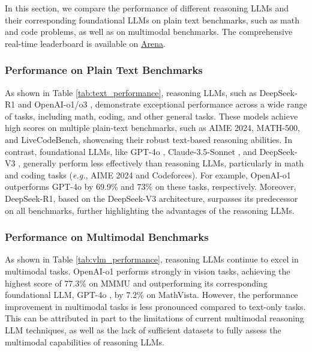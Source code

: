 In this section, we compare the performance of different reasoning LLMs and their corresponding foundational LLMs on plain text benchmarks, such as math and code problems, as well as on multimodal benchmarks. 
The comprehensive real-time leaderboard is available on \href{https://lmarena.ai/?leaderboard}{Arena}.




\subsubsection{Performance on Plain Text Benchmarks}

As shown in Table \ref{tab:text_performance}, reasoning LLMs, such as DeepSeek-R1 \cite{Deepseek-R1} and OpenAI-o1/o3 \cite{openai_o1, o3-mini}, demonstrate exceptional performance across a wide range of tasks, including math, coding, and other general tasks. 
These models achieve high scores on multiple plain-text benchmarks, such as AIME 2024, MATH-500, and LiveCodeBench, showcasing their robust text-based reasoning abilities. 
In contrast, foundational LLMs, like GPT-4o \cite{openai2023gpt4}, Claude-3.5-Sonnet \cite{claude-3-5-sonnet}, and DeepSeek-V3 \cite{liu2024deepseek}, generally perform less effectively than reasoning LLMs, particularly in math and coding tasks (\emph{e.g.}, AIME 2024 and Codeforces). For example, OpenAI-o1 outperforms GPT-4o by 69.9\% and 73\% on these tasks, respectively. 
Moreover, DeepSeek-R1, based on the DeepSeek-V3 architecture, surpasses its predecessor on all benchmarks, further highlighting the advantages of the reasoning LLMs.







\subsubsection{Performance on Multimodal Benchmarks}

As shown in Table \ref{tab:vlm_performance}, reasoning LLMs continue to excel in multimodal tasks. OpenAI-o1 \cite{openai_o1} performs strongly in vision tasks, achieving the highest score of 77.3\% on MMMU and outperforming its corresponding foundational LLM, GPT-4o \cite{openai2023gpt4}, by 7.2\% on MathVista. However, the performance improvement in multimodal tasks is less pronounced compared to text-only tasks. This can be attributed in part to the limitations of current multimodal reasoning LLM techniques, as well as the lack of sufficient datasets to fully assess the multimodal capabilities of reasoning LLMs.


